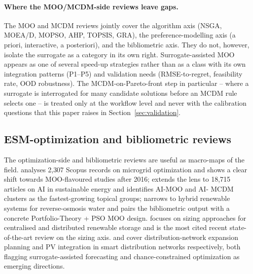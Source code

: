 \paragraph{Where the MOO/MCDM-side reviews leave gaps.}
The MOO and MCDM reviews jointly cover the algorithm axis (NSGA,
MOEA/D, MOPSO, AHP, TOPSIS, GRA), the preference-modelling axis (a
priori, interactive, a posteriori), and the bibliometric axis. They
do not, however, isolate the surrogate as a category in its own
right. Surrogate-assisted MOO appears as one of several speed-up
strategies rather than as a class with its own integration patterns
(P1--P5) and validation needs (RMSE-to-regret, feasibility rate, OOD
robustness). The MCDM-on-Pareto-front step in particular -- where a
surrogate is interrogated for many candidate solutions before an
MCDM rule selects one -- is treated only at the workflow level and
never with the calibration questions that this paper raises in
Section~\ref{sec:validation}.

\subsection{ESM-optimization and bibliometric reviews}
\label{sec:related-esm-opt}

The optimization-side and bibliometric reviews
\cite{Zhou2024__2,vahidinasab_overview_2020,Conti2026,arar_tahir_scientific_2023,batista_optimizing_2023,velasquez_intelligence_2023}
are useful as macro-maps of the field. \cite{arar_tahir_scientific_2023}
analyses 2{,}307 Scopus records on microgrid optimization and shows
a clear shift towards MOO-flavoured studies after 2016;
\cite{velasquez_intelligence_2023} extends the lens to 18{,}715
articles on AI in sustainable energy and identifies AI-MOO and AI-
MCDM clusters as the fastest-growing topical groups;
\cite{batista_optimizing_2023} narrows to hybrid renewable systems
for reverse-osmosis water and pairs the bibliometric output with a
concrete Portfolio-Theory + PSO MOO design. \cite{Zhou2024__2}
focuses on sizing approaches for centralised and distributed
renewable storage and is the most cited recent state-of-the-art
review on the sizing axis. \cite{vahidinasab_overview_2020} and
\cite{Conti2026} cover distribution-network expansion planning and
PV integration in smart distribution networks respectively, both
flagging surrogate-assisted forecasting and chance-constrained
optimization as emerging directions.

